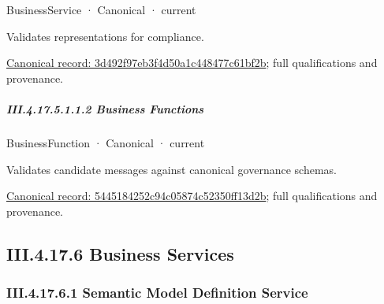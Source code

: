 \label{navigation:III.4.17.5.1.1.1.1}

\label{element:3d492f97eb3f4d50a1c448477c61bf2b}
{\small BusinessService · Canonical · current}\par

Validates representations for compliance.


{\footnotesize \href{../../../../../../../continuum/business/business-service/3d492f97eb3f4d50a1c448477c61bf2b.md}{Canonical record: 3d492f97eb3f4d50a1c448477c61bf2b}; full qualifications and provenance.}\par
\subparagraph*{III.4.17.5.1.1.2 Business Functions}
\label{navigation:III.4.17.5.1.1.2}

\label{navigation:III.4.17.5.1.1.2.1}

\label{element:5445184252c94c05874c52350ff13d2b}
{\small BusinessFunction · Canonical · current}\par

Validates candidate messages against canonical governance schemas.


{\footnotesize \href{../../../../../../../continuum/business/business-function/5445184252c94c05874c52350ff13d2b.md}{Canonical record: 5445184252c94c05874c52350ff13d2b}; full qualifications and provenance.}\par
\subsection*{III.4.17.6 Business Services}
\label{navigation:III.4.17.6}

\subsubsection*{III.4.17.6.1 Semantic Model Definition Service}
\label{navigation:III.4.17.6.1}


